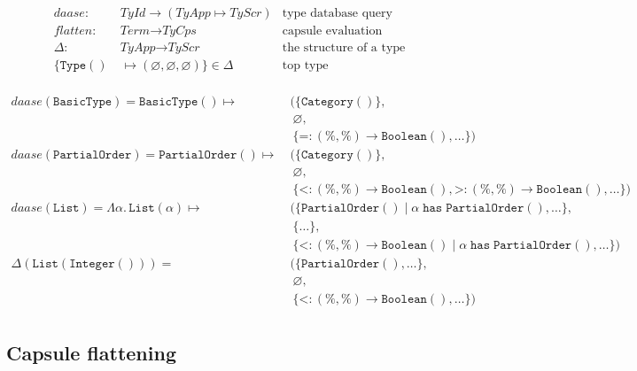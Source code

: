 \documentclass[10pt]{article}
\newcommand\Term{\textit{Term}}
\newcommand\TyId{\textit{TyId}}
\newcommand\TyApp{\textit{TyApp}}
\newcommand\TyCps{\textit{TyCps}}
\newcommand\TyScr{\textit{TyScr}}
\newcommand\Category{\texttt{Category}}
\newcommand\TyHas{\;\texttt{has}\;}
\newcommand\Guard{\;|\;}
\newcommand\Type{\texttt{Type}}
\newcommand\BasicType{\texttt{BasicType}}
\newcommand\PartialOrder{\texttt{PartialOrder}}
\newcommand\Integer{\texttt{Integer}}
\newcommand\Boolean{\texttt{Boolean}}
\newcommand\List{\texttt{List}}
\begin{document}
\begin{table}[!h]
  \begin{align*}
    daase : &\ \TyId \rightarrow (\TyApp \mapsto \TyScr) &
      \text{type database query} \\
    flatten: &\ \Term \rightarrow \TyCps &
      \text{capsule evaluation} \\
    \Delta : &\ \TyApp \rightarrow \TyScr &
      \text{the structure of a type}
    \\[0.5em]
    \{ \Type() &\; \mapsto(\varnothing, \varnothing, \varnothing) \} \in
      \Delta & \text{top type}\\
  \end{align*}

  \vspace{-1.0em}

  \begin{align*}
    daase(\BasicType) = \BasicType() \mapsto
      &\ ( \{ \Category() \}, \\
      &\ \ \varnothing, \\
      &\ \ \{ \texttt{=} : (\%,\%) \rightarrow \Boolean(), \ldots \})
    \\[0.5em]
    daase(\PartialOrder) = \PartialOrder() \mapsto
      &\ ( \{ \Category() \}, \\
      &\ \ \varnothing, \\
      &\ \ \{ \texttt{<} : (\%,\%) \rightarrow \Boolean(),
              \texttt{>} : (\%,\%) \rightarrow \Boolean(), \ldots \} )
    \\[0.5em]
    daase(\List) = \Lambda \alpha.\,\List(\alpha) \mapsto
      &\ ( \{\PartialOrder() \Guard \alpha \TyHas \PartialOrder(), \ldots \}, \\
      &\ \ \{ \ldots \}, \\
      &\ \ \{ \texttt{<} : (\%,\%) \rightarrow \Boolean() \Guard \alpha \TyHas
              \PartialOrder(), \ldots \} )
    \\[0.5em]
    \Delta(\List(\Integer())) = 
      &\ ( \{ \PartialOrder(), \ldots \}, \\
      &\ \ \varnothing, \\
      &\ \ \{ \texttt{<} : (\%,\%) \rightarrow \Boolean(), \ldots \} ) \\
  \end{align*}
\end{table}

\subsection*{Capsule flattening}
\end{document}
